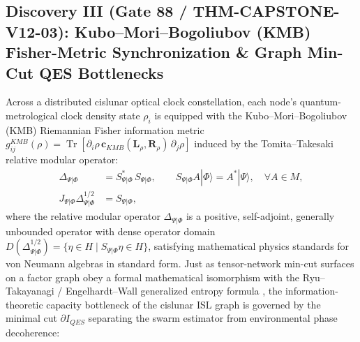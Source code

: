\documentclass[11pt,a4paper,reqno]{article}
\def\texttt#1{#1}%
\def\mathrm#1{#1}%
\def\mathcal#1{#1}%
\DeclareMathOperator{\Tr}{Tr}
\theoremstyle{plain}
\theoremstyle{definition}
\theoremstyle{remark}
\numberwithin{equation}{section}
\begin{document}
\subsection{\texorpdfstring{Discovery III (\texttt{Gate 88 / THM-CAPSTONE-V12-03}): Kubo--Mori--Bogoliubov (KMB) Fisher-Metric Synchronization \& Graph Min-Cut QES Bottlenecks}{Discovery III (Gate 88 / THM-CAPSTONE-V12-03): Kubo-Mori-Bogoliubov (KMB) Fisher-Metric Synchronization and Graph Min-Cut QES Bottlenecks}}
Across a distributed cislunar optical clock constellation, each node's quantum-metrological clock density state $\rho_i$ is equipped with the Kubo--Mori--Bogoliubov (KMB) Riemannian Fisher information metric $g_{ij}^{\mathrm{KMB}}(\rho) = \Tr\!\left[\partial_i\rho\,\mathbf{c}_{\mathrm{KMB}}(\mathbf{L}_\rho, \mathbf{R}_\rho)\,\partial_j\rho\right]$ induced by the Tomita--Takesaki relative modular operator:
\begin{equation}
\label{eq:modular_tomita_takesaki}
\begin{split}
  \Delta_{\Psi|\Phi} &= S_{\Psi|\Phi}^*\,S_{\Psi|\Phi}, \qquad 
  S_{\Psi|\Phi} A|\Phi\rangle = A^*|\Psi\rangle, \quad \forall A \in \mathcal{M}, \\
  J_{\Psi|\Phi}\Delta_{\Psi|\Phi}^{1/2} &= S_{\Psi|\Phi},
\end{split}
\end{equation}
where the relative modular operator $\Delta_{\Psi|\Phi}$ is a positive, self-adjoint, generally unbounded operator with dense operator domain $\mathcal{D}(\Delta_{\Psi|\Phi}^{1/2}) = \{\eta \in \mathcal{H} \mid S_{\Psi|\Phi}\eta \in \mathcal{H}\}$, satisfying mathematical physics standards for von Neumann algebras in standard form. Just as tensor-network min-cut surfaces on a factor graph obey a formal mathematical isomorphism with the Ryu--Takayanagi / Engelhardt--Wall generalized entropy formula \cite{Almheiri_Islands2019, Penington_Islands2020}, the information-theoretic capacity bottleneck of the cislunar ISL graph is governed by the minimal cut $\partial\mathcal{I}_{\mathrm{QES}}$ separating the swarm estimator from environmental phase decoherence:
\end{document}
